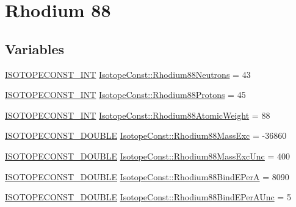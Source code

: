 \hypertarget{group___isotope_const-_rhodium-_rh88}{}\section{Rhodium 88}
\label{group___isotope_const-_rhodium-_rh88}
\subsection*{Variables}
\begin{DoxyCompactItemize}
\item 
\mbox{\hyperlink{group___isotope_const-_macros_ga5f18360b3e99483a35c32d789e62621c}{I\+S\+O\+T\+O\+P\+E\+C\+O\+N\+S\+T\+\_\+\+I\+NT}} \mbox{\hyperlink{group___isotope_const-_rhodium-_rh88_ga73ed69d21638be905e2b11a0ad212917}{Isotope\+Const\+::\+Rhodium88\+Neutrons}} = 43
\item 
\mbox{\hyperlink{group___isotope_const-_macros_ga5f18360b3e99483a35c32d789e62621c}{I\+S\+O\+T\+O\+P\+E\+C\+O\+N\+S\+T\+\_\+\+I\+NT}} \mbox{\hyperlink{group___isotope_const-_rhodium-_rh88_ga1cd43e1d65c0b47d1517fec0c1157082}{Isotope\+Const\+::\+Rhodium88\+Protons}} = 45
\item 
\mbox{\hyperlink{group___isotope_const-_macros_ga5f18360b3e99483a35c32d789e62621c}{I\+S\+O\+T\+O\+P\+E\+C\+O\+N\+S\+T\+\_\+\+I\+NT}} \mbox{\hyperlink{group___isotope_const-_rhodium-_rh88_ga8d2079a18a9f69544eea12263a699b06}{Isotope\+Const\+::\+Rhodium88\+Atomic\+Weight}} = 88
\item 
\mbox{\hyperlink{group___isotope_const-_macros_ga8f45a7272ce02c0b4c65c44636ed719a}{I\+S\+O\+T\+O\+P\+E\+C\+O\+N\+S\+T\+\_\+\+D\+O\+U\+B\+LE}} \mbox{\hyperlink{group___isotope_const-_rhodium-_rh88_ga6df7f247f7dec83ebeb55652d7d3bdc6}{Isotope\+Const\+::\+Rhodium88\+Mass\+Exc}} = -\/36860
\item 
\mbox{\hyperlink{group___isotope_const-_macros_ga8f45a7272ce02c0b4c65c44636ed719a}{I\+S\+O\+T\+O\+P\+E\+C\+O\+N\+S\+T\+\_\+\+D\+O\+U\+B\+LE}} \mbox{\hyperlink{group___isotope_const-_rhodium-_rh88_gaad41c912071ad22d6d734de60ce43369}{Isotope\+Const\+::\+Rhodium88\+Mass\+Exc\+Unc}} = 400
\item 
\mbox{\hyperlink{group___isotope_const-_macros_ga8f45a7272ce02c0b4c65c44636ed719a}{I\+S\+O\+T\+O\+P\+E\+C\+O\+N\+S\+T\+\_\+\+D\+O\+U\+B\+LE}} \mbox{\hyperlink{group___isotope_const-_rhodium-_rh88_ga0ca43e928cfa3669b82c18964d29c164}{Isotope\+Const\+::\+Rhodium88\+Bind\+E\+PerA}} = 8090
\item 
\mbox{\hyperlink{group___isotope_const-_macros_ga8f45a7272ce02c0b4c65c44636ed719a}{I\+S\+O\+T\+O\+P\+E\+C\+O\+N\+S\+T\+\_\+\+D\+O\+U\+B\+LE}} \mbox{\hyperlink{group___isotope_const-_rhodium-_rh88_ga7347790397344711847ea69722602827}{Isotope\+Const\+::\+Rhodium88\+Bind\+E\+Per\+A\+Unc}} = 5

\end{DoxyCompactItemize}

